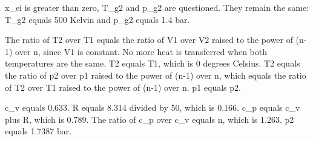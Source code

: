 x_ei is greater than zero, T_g2 and p_g2 are questioned. They remain the same: T_g2 equals 500 Kelvin and p_g2 equals 1.4 bar.

The ratio of T2 over T1 equals the ratio of V1 over V2 raised to the power of (n-1) over n, since V1 is constant. No more heat is transferred when both temperatures are the same. T2 equals T1, which is 0 degrees Celsius. T2 equals the ratio of p2 over p1 raised to the power of (n-1) over n, which equals the ratio of T2 over T1 raised to the power of (n-1) over n. p1 equals p2.

c_v equals 0.633. R equals 8.314 divided by 50, which is 0.166. c_p equals c_v plus R, which is 0.789. The ratio of c_p over c_v equals n, which is 1.263. p2 equals 1.7387 bar.